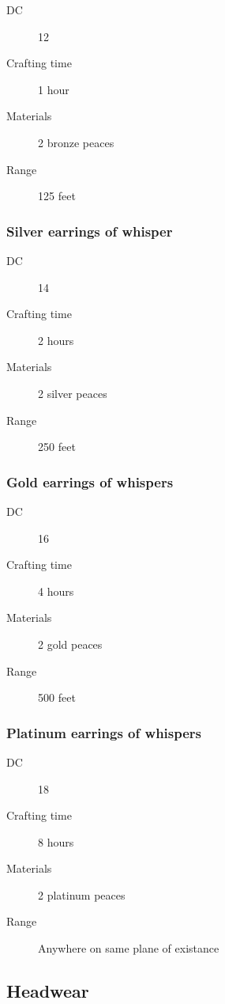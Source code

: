 \begin{description}
\item [DC] 12 \arcana
\item [Crafting time] 1 hour
\item [Materials] 2 bronze peaces
\item [Range] 125 feet
\end{description}

\subsubsection{Silver earrings of whisper}

\begin{description}
\item [DC] 14 \arcana
\item [Crafting time] 2 hours
\item [Materials] 2 silver peaces
\item [Range] 250 feet
\end{description}

\subsubsection{Gold earrings of whispers}

\begin{description}
\item [DC] 16 \arcana
\item [Crafting time] 4 hours
\item [Materials] 2 gold peaces
\item [Range] 500 feet
\end{description}

\subsubsection{Platinum earrings of whispers}

\begin{description}
\item [DC] 18 \arcana
\item [Crafting time] 8 hours
\item [Materials] 2 platinum peaces
\item [Range] Anywhere on same plane of existance
\end{description}

\subsection{Headwear}

